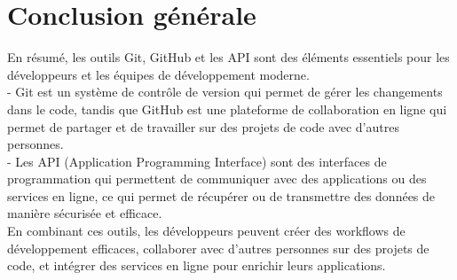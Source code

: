 \documentclass[a4paper,11pt]{article}
\begin{document}
    \newpage
    \section{Conclusion générale}
        \begin{tcolorbox}[colback=lightgray!6, colframe=black, left=5mm, right=5mm, top=2mm, bottom=2mm, boxrule=0.1mm]
            En résumé, les outils Git, GitHub et les API sont des éléments essentiels pour les développeurs et les équipes de développement moderne.\\ 
            
            - Git est un système de contrôle de version qui permet de gérer les changements dans le code, tandis que GitHub est une plateforme de collaboration en ligne qui permet de partager et de travailler sur des projets de code avec d'autres personnes.\\

            - Les API (Application Programming Interface) sont des interfaces de programmation qui permettent de communiquer avec des applications ou des services en ligne, ce qui permet de récupérer ou de transmettre des données de manière sécurisée et efficace.\\
            
            En combinant ces outils, les développeurs peuvent créer des workflows de développement efficaces, collaborer avec d'autres personnes sur des projets de code, et intégrer des services en ligne pour enrichir leurs applications.
        \end{tcolorbox}
\end{document}
